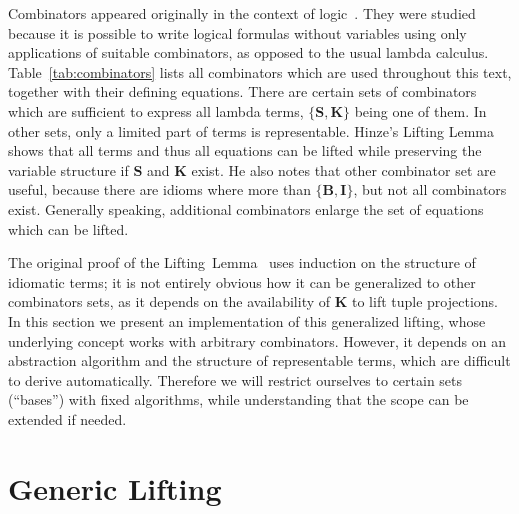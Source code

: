 Combinators appeared originally in the context of logic~\cite{curry68}.
They were studied because it is possible to write logical formulas without
variables using only applications of suitable combinators, as opposed to the
usual lambda calculus.
Table~\ref{tab:combinators} lists all combinators which are used throughout
this text, together with their defining equations.
There are certain sets of combinators which are sufficient to express all
lambda terms, $\{\mathbf{S,K}\}$ being one of them.
In other sets, only a limited part of terms is representable.
Hinze's Lifting Lemma shows that all terms and thus all equations can be
lifted while preserving the variable structure if $\mathbf{S}$ and $\mathbf{K}$
exist.
He also notes that other combinator set are useful, because there are idioms
where more than $\{\mathbf{B,I}\}$, but not all combinators exist.
Generally speaking, additional combinators enlarge the set of equations which
can be lifted.

The original proof of the Lifting~Lemma~\cite[11--14]{hinze10} uses induction
on the structure of idiomatic terms; it is not entirely obvious how it can
be generalized to other combinators sets, as it depends on the availability
of $\mathbf{K}$ to lift tuple projections.
In this section we present an implementation of this generalized lifting,
whose underlying concept works with arbitrary combinators.
However, it depends on an abstraction algorithm and the structure of
representable terms, which are difficult to derive automatically.
Therefore we will restrict ourselves to certain sets (``bases'') with
fixed algorithms, while understanding that the scope can be extended 
if needed.

\section{Generic Lifting}\label{subsec:generic-lifting}

